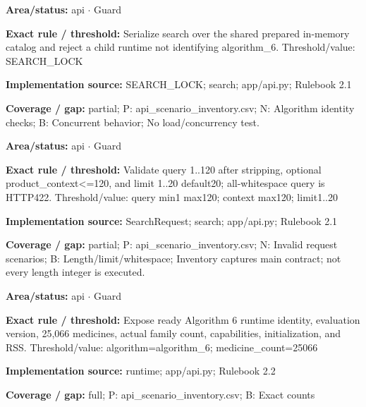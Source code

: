 \begin{tcolorbox}[enhanced,breakable,colback=white,colframe=Muted!45,boxrule=0.45pt,arc=1.5pt,left=6pt,right=6pt,top=5pt,bottom=5pt,title={\texttt{API-LOCK-02}},title after break={\texttt{API-LOCK-02}\ (continued)},fonttitle=\headingfont\bfseries\color{Navy},coltitle=Navy]
\textbf{Area/status:} api $\boldsymbol{\cdot}$ Guard\par
\smallskip
\textbf{Exact rule / threshold:} Serialize search over the shared prepared in-memory catalog and reject a child runtime not identifying algorithm\_\allowbreak{}6. Threshold/\allowbreak{}value: SEARCH\_\allowbreak{}LOCK\par
\smallskip
\textbf{Implementation source:} SEARCH\_\allowbreak{}LOCK; search; app/\allowbreak{}api.py; Rulebook 2.1\par
\smallskip
\textbf{Coverage / gap:} partial; P: api\_\allowbreak{}scenario\_\allowbreak{}inventory.csv; N: Algorithm identity checks; B: Concurrent behavior; No load/\allowbreak{}concurrency test.
\end{tcolorbox}
\begin{tcolorbox}[enhanced,breakable,colback=white,colframe=Muted!45,boxrule=0.45pt,arc=1.5pt,left=6pt,right=6pt,top=5pt,bottom=5pt,title={\texttt{API-REQUEST-01}},title after break={\texttt{API-REQUEST-01}\ (continued)},fonttitle=\headingfont\bfseries\color{Navy},coltitle=Navy]
\textbf{Area/status:} api $\boldsymbol{\cdot}$ Guard\par
\smallskip
\textbf{Exact rule / threshold:} Validate query 1..120 after stripping, optional product\_\allowbreak{}context<=120, and limit 1..20 default20; all-whitespace query is HTTP422. Threshold/\allowbreak{}value: query min1 max120; context max120; limit1..20\par
\smallskip
\textbf{Implementation source:} SearchRequest; search; app/\allowbreak{}api.py; Rulebook 2.1\par
\smallskip
\textbf{Coverage / gap:} partial; P: api\_\allowbreak{}scenario\_\allowbreak{}inventory.csv; N: Invalid request scenarios; B: Length/\allowbreak{}limit/\allowbreak{}whitespace; Inventory captures main contract; not every length integer is executed.
\end{tcolorbox}
\begin{tcolorbox}[enhanced,breakable,colback=white,colframe=Muted!45,boxrule=0.45pt,arc=1.5pt,left=6pt,right=6pt,top=5pt,bottom=5pt,title={\texttt{API-RUNTIME-04}},title after break={\texttt{API-RUNTIME-04}\ (continued)},fonttitle=\headingfont\bfseries\color{Navy},coltitle=Navy]
\textbf{Area/status:} api $\boldsymbol{\cdot}$ Guard\par
\smallskip
\textbf{Exact rule / threshold:} Expose ready Algorithm 6 runtime identity, evaluation version, 25,066 medicines, actual family count, capabilities, initialization, and RSS. Threshold/\allowbreak{}value: algorithm=algorithm\_\allowbreak{}6; medicine\_\allowbreak{}count=25066\par
\smallskip
\textbf{Implementation source:} runtime; app/\allowbreak{}api.py; Rulebook 2.2\par
\smallskip
\textbf{Coverage / gap:} full; P: api\_\allowbreak{}scenario\_\allowbreak{}inventory.csv; B: Exact counts
\end{tcolorbox}

